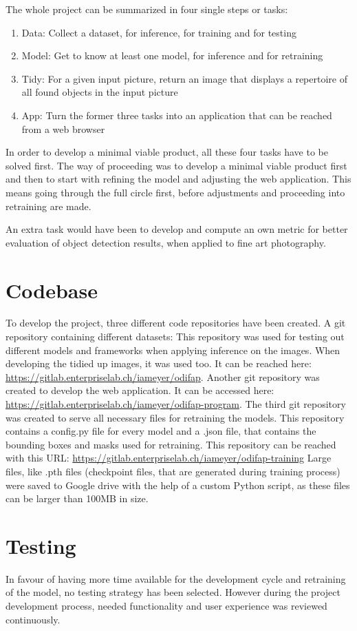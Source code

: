The whole project can be summarized in four single steps or tasks:
\begin{enumerate}
	\item Data: Collect a dataset, for inference, for training and for testing
	\item Model: Get to know at least one model, for inference and for retraining
	\item Tidy: For a given input picture, return an image that displays a repertoire of all found objects in the input picture
	\item App: Turn the former three tasks into an application that can be reached from a web browser
\end{enumerate}

In order to develop a minimal viable product, all these four tasks have to be solved first. The way of proceeding was to develop a minimal viable product first and then to start with refining the model and adjusting the web application. This means going through the full circle first, before adjustments and proceeding into retraining are made.

An extra task would have been to develop and compute an own metric for better evaluation of object detection results, when applied to fine art photography.

\section{Codebase}

To develop the project, three different code repositories have been created. A git repository containing different datasets: This repository was used for testing out different models and frameworks when applying inference on the images. When developing the tidied up images, it was used too. It can be reached here: \url{https://gitlab.enterpriselab.ch/iameyer/odifap}.
Another git repository was created to develop the web application. It can be accessed here: \url{https://gitlab.enterpriselab.ch/iameyer/odifap-program}.
The third git repository was created to serve all necessary files for retraining the models. This repository contains a config.py file for every model and a .json file, that contains the bounding boxes and masks used for retraining. This repository can be reached with this URL: \url{https://gitlab.enterpriselab.ch/iameyer/odifap-training}
Large files, like .pth files (checkpoint files, that are generated during training process) were saved to Google drive with the help of a custom Python script, as these files can be larger than 100MB in size.

\section{Testing}

In favour of having more time available for the development cycle and retraining of the model, no testing strategy has been selected. However during the project development process, needed functionality and user experience was reviewed continuously.
